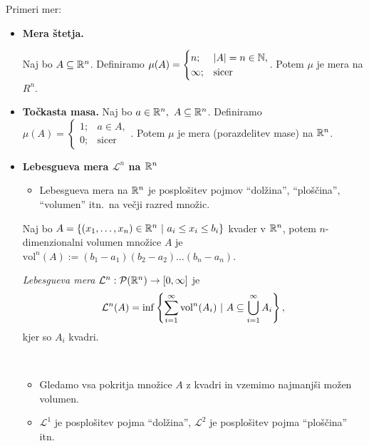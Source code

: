\begin{primer} Primeri mer:
    \begin{itemize}
        \item \textbf{Mera štetja.}
        
        Naj bo \(A \subseteq \mathbb{R}^n\). Definiramo \(\mu(A) = \begin{cases}
            n; &|A| = n \in \mathbb{N}, \\ \infty; &\text{sicer}
        \end{cases}\).
        Potem \(\mu\) je mera na \(R^n\).
        \item \textbf{Točkasta masa.}
        Naj bo \(a \in \mathbb{R}^n, \ A \subseteq \mathbb{R}^n\). Definiramo \(\mu(A) = \begin{cases}
            1; &a \in A, \\ 0; &\text{sicer}
        \end{cases}\).
        Potem \(\mu\) je mera (porazdelitev mase) na \(\mathbb{R}^n\).
        \newpage
        \item \textbf{Lebesgueva mera \(\mathcal{L}^n\) na \(\mathbb{R}^n\)}
        \begin{itemize}
            \item Lebesgueva mera na \(\mathbb{R}^n\) je posplošitev pojmov "`dolžina"', "`ploščina"', "`volumen"' itn.\  na večji razred množic.                  
        \end{itemize}
        Naj bo \(A = \left\{(x_1, \ldots, x_n) \in \mathbb{R}^n \ | \  a_i \leq x_i \leq b_i\right\}\) kvader v \(\mathbb{R}^n\), potem \(n\)-dimenzionalni volumen množice \(A\) je \(\text{vol}^n(A) := (b_1 - a_1)(b_2-a_2)\ldots(b_n - a_n)\).
        \begin{definicija}
            \emph{Lebesgueva mera \(\mathcal{L}^n: \mathcal{P}(\mathbb{R}^n) \to [0, \infty]\)} je 
            \[\mathcal{L}^n(A) = \inf \left\{\sum_{i=1}^{\infty} \text{vol}^n(A_i)  \ | \ A \subseteq \bigcup_{i =1}^\infty A_i\right\},\]
            kjer so \(A_i\) kvadri.
        \end{definicija}  
        \begin{opomba} \
            \begin{itemize}
                \item Gledamo vsa pokritja množice \(A\) z kvadri in vzemimo najmanjši možen volumen.
                \item \(\mathcal{L}^1\) je posplošitev pojma "`dolžina"', \(\mathcal{L}^2\) je posplošitev pojma "`ploščina"' itn.
            \end{itemize}            
        \end{opomba}  
    \end{itemize}
\end{primer}
